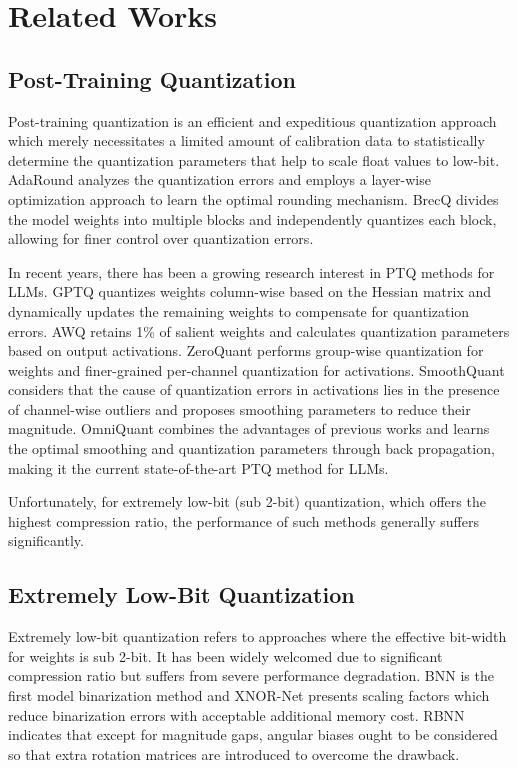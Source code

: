 \section{Related Works}
\subsection{Post-Training Quantization}
Post-training quantization is an efficient and expeditious quantization approach which merely necessitates a limited amount of calibration data to statistically determine the quantization parameters that help to scale float values to low-bit. AdaRound \citep{nagel2020up} analyzes the quantization errors and employs a layer-wise optimization approach to learn the optimal rounding mechanism. BrecQ \citep{li2021brecq} divides the model weights into multiple blocks and independently quantizes each block, allowing for finer control over quantization errors.

In recent years, there has been a growing research interest in PTQ methods for LLMs. GPTQ \citep{frantar2022gptq} quantizes weights column-wise based on the Hessian matrix and dynamically updates the remaining weights to compensate for quantization errors. AWQ \citep{lin2023awq} retains 1\% of salient weights and calculates quantization parameters based on output activations. ZeroQuant \citep{yao2022zeroquant} performs group-wise quantization for weights and finer-grained per-channel quantization for activations. SmoothQuant \citep{xiao2023smoothquant} considers that the cause of quantization errors in activations lies in the presence of channel-wise outliers and proposes smoothing parameters to reduce their magnitude. OmniQuant \citep{OmniQuant} combines the advantages of previous works and learns the optimal smoothing and quantization parameters through back propagation, making it the current state-of-the-art PTQ method for LLMs.

Unfortunately, for extremely low-bit (sub 2-bit) quantization, which offers the highest compression ratio, the performance of such methods generally suffers significantly. 



\subsection{Extremely Low-Bit Quantization}

Extremely low-bit quantization refers to approaches where the effective bit-width for weights is sub 2-bit. It has been widely welcomed due to significant compression ratio but suffers from severe performance degradation. BNN \citep{courbariaux2016binarized} is the first model binarization method and %
XNOR-Net \citep{rastegari2016xnor} presents scaling factors which reduce binarization errors with acceptable additional memory cost. RBNN \citep{lin2020rotated} indicates that except for magnitude gaps, angular biases ought to be considered so that extra rotation matrices are introduced to overcome the drawback.

